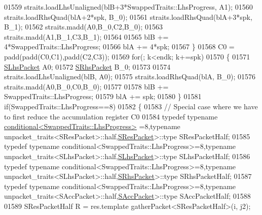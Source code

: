 \begin{DoxyCode}
01559               straits.loadLhsUnaligned(blB+3*SwappedTraits::LhsProgress, A1);
01560               straits.loadRhsQuad(blA+2*spk, B\_0);
01561               straits.loadRhsQuad(blA+3*spk, B\_1);
01562               straits.madd(A0,B\_0,C2,B\_0);
01563               straits.madd(A1,B\_1,C3,B\_1);
01564 
01565               blB += 4*SwappedTraits::LhsProgress;
01566               blA += 4*spk;
01567             \}
01568             C0 = padd(padd(C0,C1),padd(C2,C3));
01569             \textcolor{keywordflow}{for}(; k<endk; k+=spk)
01570             \{
01571               \hyperlink{class_eigen_1_1internal_1_1_tensor_lazy_evaluator_writable}{SLhsPacket} A0;
01572               \hyperlink{class_eigen_1_1internal_1_1_tensor_lazy_evaluator_writable}{SRhsPacket} B\_0;
01573 
01574               straits.loadLhsUnaligned(blB, A0);
01575               straits.loadRhsQuad(blA, B\_0);
01576               straits.madd(A0,B\_0,C0,B\_0);
01577 
01578               blB += SwappedTraits::LhsProgress;
01579               blA += spk;
01580             \}
01581             \textcolor{keywordflow}{if}(SwappedTraits::LhsProgress==8)
01582             \{
01583               \textcolor{comment}{// Special case where we have to first reduce the accumulation register C0}
01584               \textcolor{keyword}{typedef} \textcolor{keyword}{typename} \hyperlink{struct_eigen_1_1internal_1_1conditional}{conditional<SwappedTraits::LhsProgress>}
      =8,\textcolor{keyword}{typename} unpacket\_traits<SResPacket>::half,\hyperlink{class_eigen_1_1internal_1_1_tensor_lazy_evaluator_writable}{SResPacket}>::type SResPacketHalf;
01585               \textcolor{keyword}{typedef} \textcolor{keyword}{typename} conditional<SwappedTraits::LhsProgress>=8,\textcolor{keyword}{typename} 
      unpacket\_traits<SLhsPacket>::half,\hyperlink{class_eigen_1_1internal_1_1_tensor_lazy_evaluator_writable}{SLhsPacket}>::type SLhsPacketHalf;
01586               \textcolor{keyword}{typedef} \textcolor{keyword}{typename} conditional<SwappedTraits::LhsProgress>=8,\textcolor{keyword}{typename} 
      unpacket\_traits<SLhsPacket>::half,\hyperlink{class_eigen_1_1internal_1_1_tensor_lazy_evaluator_writable}{SRhsPacket}>::type SRhsPacketHalf;
01587               \textcolor{keyword}{typedef} \textcolor{keyword}{typename} conditional<SwappedTraits::LhsProgress>=8,\textcolor{keyword}{typename} 
      unpacket\_traits<SAccPacket>::half,\hyperlink{class_eigen_1_1internal_1_1_tensor_lazy_evaluator_writable}{SAccPacket}>::type SAccPacketHalf;
01588 
01589               SResPacketHalf R = res.template gatherPacket<SResPacketHalf>(i, j2);

\end{DoxyCode}
